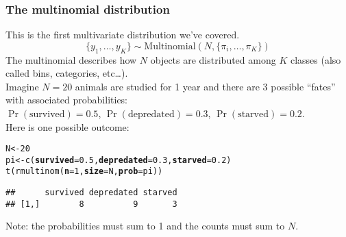 \documentclass[color=usenames,dvipsnames]{beamer}\usepackage[]{graphicx}\usepackage[]{xcolor}
\makeatletter
\newcommand{\hlnum}[1]{\textcolor[rgb]{0.69,0.494,0}{#1}}%
\newcommand{\hlstd}[1]{\textcolor[rgb]{0,0,0}{#1}}%
\newcommand{\hlkwb}[1]{\textcolor[rgb]{0,0.341,0.682}{#1}}%
\newcommand{\hlkwc}[1]{\textcolor[rgb]{0,0,0}{\textbf{#1}}}%
\newcommand{\hlkwd}[1]{\textcolor[rgb]{0.004,0.004,0.506}{#1}}%
\newenvironment{kframe}{%
 \def\at@end@of@kframe{}%
 \ifinner\ifhmode%
  \def\at@end@of@kframe{\end{minipage}}%
  \begin{minipage}{\columnwidth}%
 \fi\fi%
 \def\FrameCommand##1{\hskip\@totalleftmargin \hskip-\fboxsep
 \colorbox{shadecolor}{##1}\hskip-\fboxsep
     \hskip-\linewidth \hskip-\@totalleftmargin \hskip\columnwidth}%
 \MakeFramed {\advance\hsize-\width
   \@totalleftmargin\z@ \linewidth\hsize
   \@setminipage}}%
 {\par\unskip\endMakeFramed%
 \at@end@of@kframe}
\newenvironment{knitrout}{}{} %
\makeatother
\begin{document}
\begin{frame}[fragile]
  \frametitle{The multinomial distribution}
  \small
  This is the first multivariate distribution we've covered. \\
  \[
    \{y_{1}, \dots, y_{K}\}  \sim \mathrm{Multinomial}(N, \{\pi_i, \dots, \pi_K\})
  \]
  \pause
  The multinomial describes how $N$ objects are distributed among
  $K$ classes (also called bins, categories, etc\dots). \\
  \pause
  \vfill
  Imagine $N=20$ animals are studied for 1 year and there are 3
  possible ``fates'' with associated probabilities: \\
  $\Pr(\mathrm{survived})=0.5$, $\Pr(\mathrm{depredated})=0.3$, $\Pr(\mathrm{starved})=0.2$. \\
  \pause
  \vfill
  Here is one possible outcome:
  \vspace{-6pt}
\begin{knitrout}\footnotesize
{}\color{fgcolor}\begin{kframe}
\begin{alltt}
\hlstd{N} \hlkwb{<-} \hlnum{20}
\hlstd{pi} \hlkwb{<-} \hlkwd{c}\hlstd{(}\hlkwc{survived}\hlstd{=}\hlnum{0.5}\hlstd{,} \hlkwc{depredated}\hlstd{=}\hlnum{0.3}\hlstd{,} \hlkwc{starved}\hlstd{=}\hlnum{0.2}\hlstd{)}
\hlkwd{t}\hlstd{(}\hlkwd{rmultinom}\hlstd{(}\hlkwc{n}\hlstd{=}\hlnum{1}\hlstd{,} \hlkwc{size}\hlstd{=N,} \hlkwc{prob}\hlstd{=pi))}
\end{alltt}
\begin{verbatim}
##      survived depredated starved
## [1,]        8          9       3
\end{verbatim}
\end{kframe}
\end{knitrout}
  \pause
  \centering
  Note: the probabilities must sum to 1 and the counts must sum to $N$. \\
\end{frame}



\end{document}
